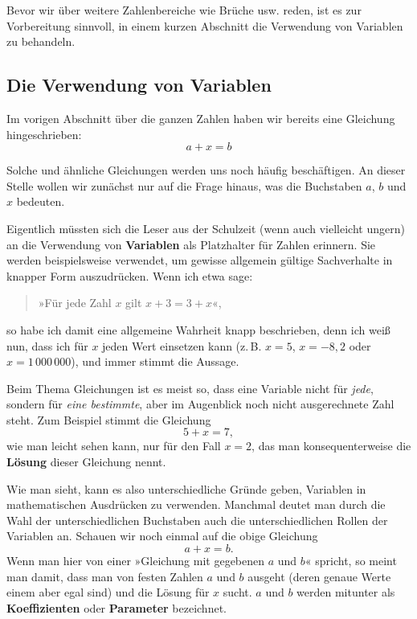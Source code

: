 \begin{center}
\end{center}

Bevor wir über weitere Zahlenbereiche wie Brüche usw. reden, ist es zur Vorbereitung sinnvoll, in einem kurzen Abschnitt die Verwendung von Variablen zu behandeln.

\subsection{Die Verwendung von Variablen}

Im vorigen Abschnitt über die ganzen Zahlen haben wir bereits eine Gleichung hingeschrieben:
\[ a + x = b \]

Solche und ähnliche Gleichungen werden uns noch häufig beschäftigen. An dieser Stelle wollen wir zunächst nur auf die Frage hinaus, was die Buchstaben $a$, $b$ und $x$ bedeuten.

Eigentlich müssten sich die Leser aus der Schulzeit (wenn auch vielleicht ungern) an die Verwendung von \textbf{Variablen} als Platzhalter für Zahlen erinnern. Sie werden beispielsweise verwendet, um gewisse allgemein gültige Sachverhalte in knapper Form auszudrücken. Wenn ich etwa sage:
\begin{quote}
  »Für jede Zahl $x$ gilt $x + 3 = 3 + x$«,
\end{quote}
so habe ich damit eine allgemeine Wahrheit knapp beschrieben, denn ich weiß nun, dass ich für $x$ jeden Wert einsetzen kann (z.\,B. $x = 5$, $x = -8{,}2$ oder $x = 1\,000\,000$), und immer stimmt die Aussage.

Beim Thema Gleichungen ist es meist so, dass eine Variable nicht für \emph{jede}, sondern für \emph{eine bestimmte}, aber im Augenblick noch nicht ausgerechnete Zahl steht. Zum Beispiel stimmt die Gleichung
\[ 5 + x = 7 , \]
wie man leicht sehen kann, nur für den Fall $x = 2$, das man konsequenterweise die \textbf{Lösung} dieser Gleichung nennt.

Wie man sieht, kann es also unterschiedliche Gründe geben, Variablen in mathematischen Ausdrücken zu verwenden. Manchmal deutet man durch die Wahl der unterschiedlichen Buchstaben auch die unterschiedlichen Rollen der Variablen an. Schauen wir noch einmal auf die obige Gleichung
\[ a + x = b . \]
Wenn man hier von einer »Gleichung mit gegebenen $a$ und $b$« spricht, so meint man damit, dass man von festen Zahlen $a$ und $b$ ausgeht (deren genaue Werte einem aber egal sind) und die Lösung für $x$ sucht. $a$ und $b$ werden mitunter als \textbf{Koeffizienten} oder \textbf{Parameter} bezeichnet.

